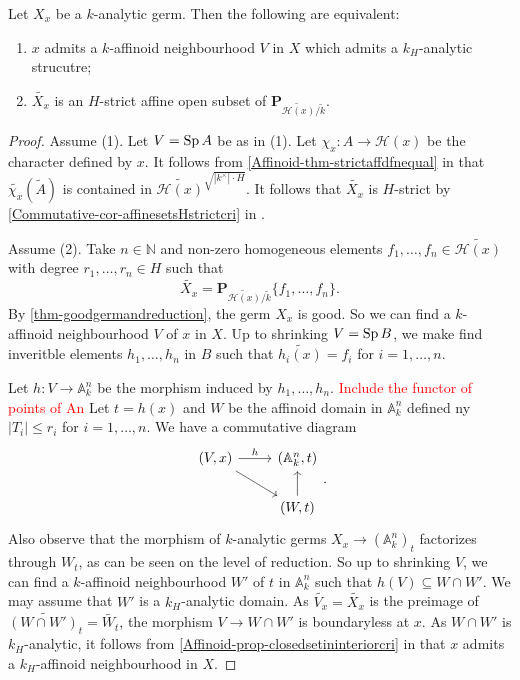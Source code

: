 \begin{lemma}\label{lma-khaffinoidnh}
    Let $X_x$ be a $k$-analytic germ. Then the following are equivalent:
    \begin{enumerate}
        \item $x$ admits a $k$-affinoid neighbourhood $V$ in $X$ which admits  a $k_H$-analytic strucutre;
        \item $\widetilde{X_x}$ is an $H$-strict affine open subset of $\mathbf{P}_{\widetilde{\mathscr{H}(x)}/\tilde{k}}$.
    \end{enumerate}
\end{lemma}
\begin{proof}
    Assume (1). Let $V=\operatorname{Sp} A$ be as in (1). Let $\chi_x:A\rightarrow \mathscr{H}(x)$ be the character defined by $x$. It follows from \cref{Affinoid-thm-strictaffdfnequal} in  that $\widetilde{\chi_x}(\tilde{A})$ is contained in $\widetilde{\mathscr{H}(x)}^{\sqrt{|k^{\times}|\cdot H}}$. It follows that $\widetilde{X_x}$ is $H$-strict by \cref{Commutative-cor-affinesetsHstrictcri} in .

    Assume (2).  Take $n\in \mathbb{N}$ and non-zero homogeneous elements $f_1,\ldots,f_n\in \widetilde{\mathscr{H}(x)}$ with degree $r_1,\ldots,r_n\in H$ such that 
    \[
        \widetilde{X_x}=  \mathbf{P}_{\widetilde{\mathscr{H}(x)}/\tilde{k}}\{f_1,\ldots,f_n\}.
    \]
    By \cref{thm-goodgermandreduction}, the germ $X_x$ is good. So we can find a $k$-affinoid neighbourhood $V$ of $x$ in $X$. Up to shrinking $V=\operatorname{Sp} B$, we make find inveritble elements $h_1,\ldots,h_n$ in $B$ such that $\widetilde{h_i(x)}=f_i$ for $i=1,\ldots,n$.

    Let $h:V\rightarrow \mathbb{A}_k^{n}$ be the morphism induced by $h_1,\ldots,h_n$. \textcolor{red}{Include the functor of points of An}
    Let $t=h(x)$ and $W$ be the affinoid domain in $\mathbb{A}_k^{n}$ defined ny $|T_i|\leq r_i$ for $i=1,\ldots,n$. We have a commutative diagram
    \[
        \begin{tikzcd}
            {(V,x)} \arrow[r, "h"] \arrow[rd] & {(\mathbb{A}_k^n,t)} \\
                                              & {(W,t)} \arrow[u]   
        \end{tikzcd}.  
    \]
    Also observe that the morphism of $k$-analytic germs $X_x\rightarrow (\mathbb{A}_k^n)_t$ factorizes through $W_t$, as can be seen on the level of reduction. So up to shrinking $V$, we can find a $k$-affinoid neighbourhood $W'$ of $t$ in $\mathbb{A}_k^n$ such that $h(V)\subseteq W\cap W'$. We may assume that $W'$ is a $k_H$-analytic domain. As $\widetilde{V_x}=\widetilde{X_x}$ is the preimage of $\widetilde{(W\cap W')_t}=\widetilde{W_t}$, the morphism $V\rightarrow W\cap W'$ is boundaryless at $x$. As $W\cap W'$ is $k_H$-analytic, it follows from \cref{Affinoid-prop-closedsetininteriorcri} in  that $x$ admits a $k_H$-affinoid neighbourhood in $X$.
\end{proof}

